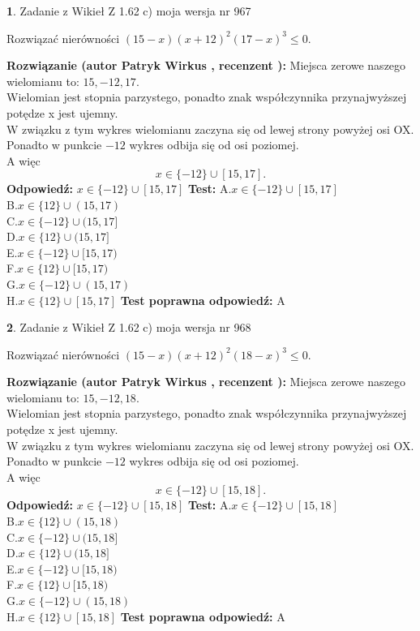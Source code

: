 \documentclass[12pt, a4paper]{article}
\theoremstyle{definition} %
\newtheorem{zad}{}
\newcommand{\zadStart}[1]{\begin{zad}#1\newline}
\newcommand{\zadStop}{\end{zad}}
\newcommand{\rozwStart}[2]{\noindent \textbf{Rozwiązanie (autor #1 , recenzent #2): }\newline}
\newcommand{\rozwStop}{\newline}
\newcommand{\odpStart}{\noindent \textbf{Odpowiedź:}\newline}
\newcommand{\odpStop}{\newline}
\newcommand{\testStart}{\noindent \textbf{Test:}\newline}
\newcommand{\testStop}{\newline}
\newcommand{\kluczStart}{\noindent \textbf{Test poprawna odpowiedź:}\newline}
\newcommand{\kluczStop}{\newline}
\begin{document}
\zadStart{Zadanie z Wikieł Z 1.62 c) moja wersja nr 967}

Rozwiązać nierówności $(15-x)(x+12)^{2}(17-x)^{3}\le0$.
\zadStop
\rozwStart{Patryk Wirkus}{}
Miejsca zerowe naszego wielomianu to: $15, -12, 17$.\\
Wielomian jest stopnia parzystego, ponadto znak współczynnika przy\linebreak najwyższej potędze x jest ujemny.\\ W związku z tym wykres wielomianu zaczyna się od lewej strony powyżej osi OX.\\
Ponadto w punkcie $-12$ wykres odbija się od osi poziomej.\\
A więc $$x \in \{-12\} \cup [15,17].$$
\rozwStop
\odpStart
$x \in \{-12\} \cup [15,17]$
\odpStop
\testStart
A.$x \in \{-12\} \cup [15,17]$\\
B.$x \in \{12\} \cup (15,17)$\\
C.$x \in \{-12\} \cup (15,17]$\\
D.$x \in \{12\} \cup (15,17]$\\
E.$x \in \{-12\} \cup [15,17)$\\
F.$x \in \{12\} \cup [15,17)$\\
G.$x \in \{-12\} \cup (15,17)$\\
H.$x \in \{12\} \cup [15,17]$
\testStop
\kluczStart
A
\kluczStop



\zadStart{Zadanie z Wikieł Z 1.62 c) moja wersja nr 968}

Rozwiązać nierówności $(15-x)(x+12)^{2}(18-x)^{3}\le0$.
\zadStop
\rozwStart{Patryk Wirkus}{}
Miejsca zerowe naszego wielomianu to: $15, -12, 18$.\\
Wielomian jest stopnia parzystego, ponadto znak współczynnika przy\linebreak najwyższej potędze x jest ujemny.\\ W związku z tym wykres wielomianu zaczyna się od lewej strony powyżej osi OX.\\
Ponadto w punkcie $-12$ wykres odbija się od osi poziomej.\\
A więc $$x \in \{-12\} \cup [15,18].$$
\rozwStop
\odpStart
$x \in \{-12\} \cup [15,18]$
\odpStop
\testStart
A.$x \in \{-12\} \cup [15,18]$\\
B.$x \in \{12\} \cup (15,18)$\\
C.$x \in \{-12\} \cup (15,18]$\\
D.$x \in \{12\} \cup (15,18]$\\
E.$x \in \{-12\} \cup [15,18)$\\
F.$x \in \{12\} \cup [15,18)$\\
G.$x \in \{-12\} \cup (15,18)$\\
H.$x \in \{12\} \cup [15,18]$
\testStop
\kluczStart
A
\kluczStop
\end{document}
